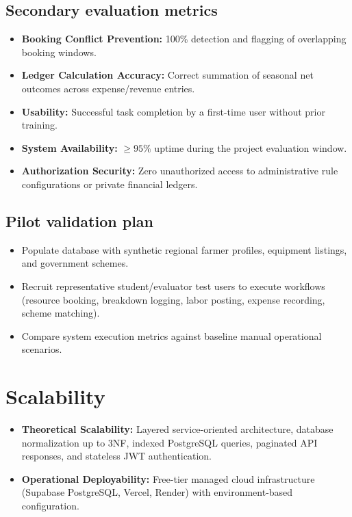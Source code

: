 \documentclass[11pt,a4paper]{article}
\begin{document}
\subsection{Secondary evaluation metrics}
\begin{itemize}[leftmargin=*]
    \item \textbf{Booking Conflict Prevention:} 100\% detection and flagging of overlapping booking windows.
    \item \textbf{Ledger Calculation Accuracy:} Correct summation of seasonal net outcomes across expense/revenue entries.
    \item \textbf{Usability:} Successful task completion by a first-time user without prior training.
    \item \textbf{System Availability:} $\ge 95\%$ uptime during the project evaluation window.
    \item \textbf{Authorization Security:} Zero unauthorized access to administrative rule configurations or private financial ledgers.
\end{itemize}

\subsection{Pilot validation plan}
\begin{itemize}[leftmargin=*]
    \item Populate database with synthetic regional farmer profiles, equipment listings, and government schemes.
    \item Recruit representative student/evaluator test users to execute workflows (resource booking, breakdown logging, labor posting, expense recording, scheme matching).
    \item Compare system execution metrics against baseline manual operational scenarios.
\end{itemize}

\section{Scalability}
\begin{itemize}[leftmargin=*]
    \item \textbf{Theoretical Scalability:} Layered service-oriented architecture, database normalization up to 3NF, indexed PostgreSQL queries, paginated API responses, and stateless JWT authentication.
    \item \textbf{Operational Deployability:} Free-tier managed cloud infrastructure (Supabase PostgreSQL, Vercel, Render) with environment-based configuration.
\end{itemize}
\end{document}

